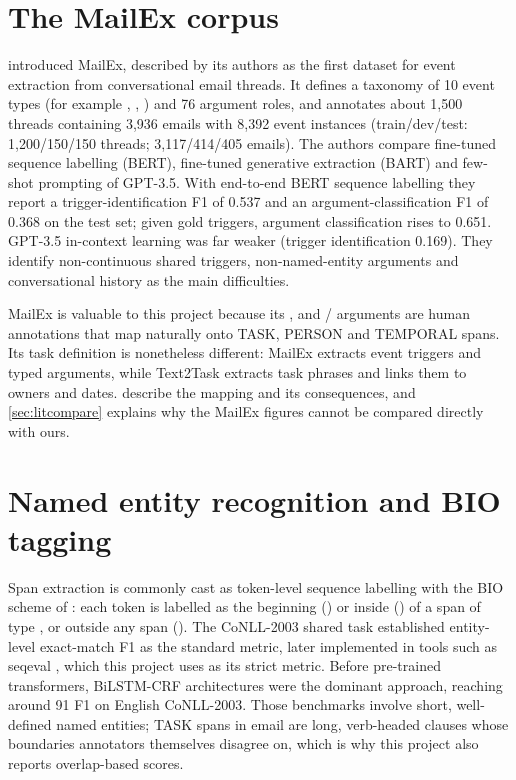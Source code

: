 \section{The MailEx corpus}
\citet{srivastava2023mailex} introduced MailEx, described by its authors as the first dataset for event extraction from conversational email threads. It defines a taxonomy of 10 event types (for example , , ) and 76 argument roles, and annotates about 1,500 threads containing 3,936 emails with 8,392 event instances (train/dev/test: 1,200/150/150 threads; 3,117/414/405 emails). The authors compare fine-tuned sequence labelling (BERT), fine-tuned generative extraction (BART) and few-shot prompting of GPT-3.5. With end-to-end BERT sequence labelling they report a trigger-identification F1 of 0.537 and an argument-classification F1 of 0.368 on the test set; given gold triggers, argument classification rises to 0.651. GPT-3.5 in-context learning was far weaker (trigger identification 0.169). They identify non-continuous shared triggers, non-named-entity arguments and conversational history as the main difficulties.

MailEx is valuable to this project because its ,  and / arguments are human annotations that map naturally onto TASK, PERSON and TEMPORAL spans. Its task definition is nonetheless different: MailEx extracts event triggers and typed arguments, while Text2Task extracts task phrases and links them to owners and dates.  describe the mapping and its consequences, and \cref{sec:litcompare} explains why the MailEx figures cannot be compared directly with ours.

\section{Named entity recognition and BIO tagging}
Span extraction is commonly cast as token-level sequence labelling with the BIO scheme of \citet{ramshaw1995chunking}: each token is labelled as the beginning () or inside () of a span of type , or outside any span (). The CoNLL-2003 shared task \citep{tjongkimsang2003conll} established entity-level exact-match F1 as the standard metric, later implemented in tools such as seqeval \citep{nakayama2018seqeval}, which this project uses as its strict metric. Before pre-trained transformers, BiLSTM-CRF architectures \citep{lample2016ner} were the dominant approach, reaching around 91 F1 on English CoNLL-2003. Those benchmarks involve short, well-defined named entities; TASK spans in email are long, verb-headed clauses whose boundaries annotators themselves disagree on, which is why this project also reports overlap-based scores.

